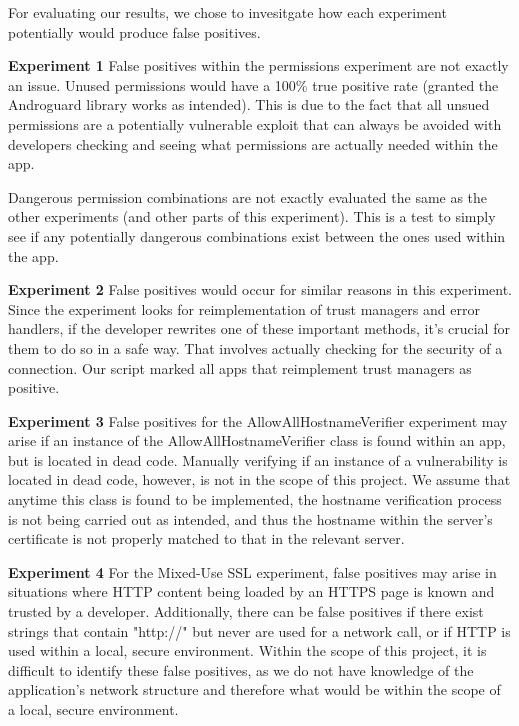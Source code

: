 For evaluating our results, we chose to invesitgate how each experiment potentially would produce false positives.

\textbf{Experiment 1}
False positives within the permissions experiment are not exactly an issue. Unused permissions would have a 100\% true positive rate (granted the Androguard library works as intended). 
This is due to the fact that all unsued permissions are a potentially vulnerable exploit that can always be avoided with developers checking and seeing what permissions are actually needed within the app. 

Dangerous permission combinations are not exactly evaluated the same as the other experiments (and other parts of this experiment). This is a test to simply see if any potentially dangerous combinations exist between 
the ones used within the app. 

\textbf{Experiment 2}
False positives would occur for similar reasons in this experiment. 
Since the experiment looks for reimplementation of trust managers and error handlers,
if the developer rewrites one of these important methods, 
it's crucial for them to do so in a safe way. 
That involves actually checking for the security of a connection.
Our script marked all apps that reimplement trust managers as positive. 


\textbf{Experiment 3}
False positives for the AllowAllHostnameVerifier experiment may arise if an instance of the AllowAllHostnameVerifier 
class is found within an app, but is located in dead code. Manually verifying if an instance of a vulnerability is located 
in dead code, however, is not in the scope of this project. We assume that anytime this class is found to be implemented, the hostname verification process is not being carried out as intended, and thus the 
hostname within the server's certificate is not properly matched to that in the relevant server. 

\textbf{Experiment 4}
For the Mixed-Use SSL experiment, false positives may arise in situations where HTTP content being loaded by an HTTPS page is known and trusted by a developer. Additionally, there 
can be false positives if there exist strings that contain "http://" but never are used for a network call, or if HTTP is used within a local, secure environment. Within the scope of this
project, it is difficult to identify these false positives, as we do not have knowledge of the application's network structure and therefore what would be within the scope of a local, secure environment. 

